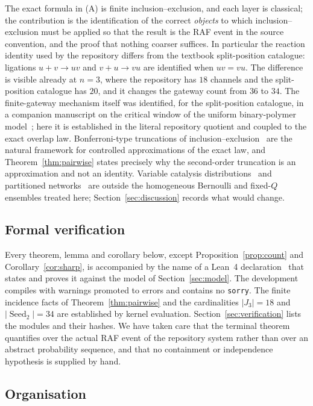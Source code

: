 \documentclass[11pt,a4paper]{article}
\theoremstyle{plain}
\theoremstyle{definition}
\theoremstyle{remark}
\newcommand{\lean}[1]{\begingroup\def\_{\char`\_\allowbreak}\texttt{#1}\endgroup}
\newcommand{\seed}{\operatorname{Seed}}
\begin{document}
The exact formula in (A) is finite inclusion--exclusion, and each layer is classical; the contribution is the identification of the correct \emph{objects} to which inclusion--exclusion must be applied so that the result is the RAF event in the source convention, and the proof that nothing coarser suffices. In particular the reaction identity used by the repository differs from the textbook split-position catalogue: ligations $u+v\to uv$ and $v+u\to vu$ are identified when $uv=vu$. The difference is visible already at $n=3$, where the repository has $18$ channels and the split-position catalogue has $20$, and it changes the gateway count from $36$ to $34$. The finite-gateway mechanism itself was identified, for the split-position catalogue, in a companion manuscript on the critical window of the uniform binary-polymer model~\cite{criticalwindow2026}; here it is established in the literal repository quotient and coupled to the exact overlap law. Bonferroni-type truncations of inclusion--exclusion~\cite{galambos1996bonferroni} are the natural framework for controlled approximations of the exact law, and Theorem~\ref{thm:pairwise} states precisely why the second-order truncation is an approximation and not an identity. Variable catalysis distributions~\cite{hordijk2016variable} and partitioned networks~\cite{smith2014partitioned} are outside the homogeneous Bernoulli and fixed-$Q$ ensembles treated here; Section~\ref{sec:discussion} records what would change.

\subsection*{Formal verification}

Every theorem, lemma and corollary below, except Proposition~\ref{prop:count} and Corollary~\ref{cor:sharp}, is accompanied by the name of a Lean~4 declaration~\cite{demoura2021lean4,mathlib2020} that states and proves it against the model of Section~\ref{sec:model}. The development compiles with warnings promoted to errors and contains no \lean{sorry}. The finite incidence facts of Theorem~\ref{thm:pairwise} and the cardinalities $|J_3|=18$ and $|\seed_2|=34$ are established by kernel evaluation. Section~\ref{sec:verification} lists the modules and their hashes. We have taken care that the terminal theorem quantifies over the actual RAF event of the repository system rather than over an abstract probability sequence, and that no containment or independence hypothesis is supplied by hand.

\subsection*{Organisation}
\end{document}
